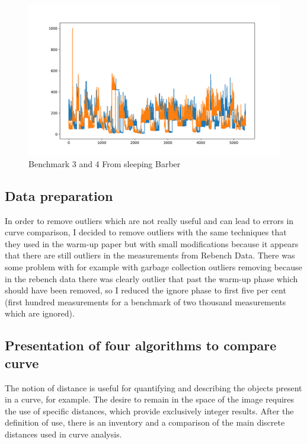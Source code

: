 \documentclass{article}
\begin{document}
\begin{figure}[h!]
    \centering
    \includegraphics[width=1\textwidth]{plot_1.png}
    \caption{Benchmark 3 and 4 From sleeping Barber}
    \label{fig:bench_2_3}
\end{figure}

\subsection{Data preparation}

In order to remove outliers which are not really useful and can lead to errors in curve comparison, I decided to remove outliers with the same techniques that they used in the warm-up paper but with small modifications because it appears that there are still outliers in the measurements from Rebench Data. There was some problem with for example with garbage collection outliers removing because in the rebench data there was clearly outlier that past the warm-up phase which should have been removed, so I reduced the ignore phase to first five per cent (first hundred measurements for a benchmark of two thousand measurements which are ignored).


\subsection{Presentation of four algorithms to compare curve}

The notion of distance is useful for quantifying and describing the objects present in
a curve, for example. The desire to remain in the space of the image requires the use of specific distances, which provide exclusively integer results. After the definition of use, there is an inventory and a comparison of the main discrete distances used in curve analysis.
\end{document}
